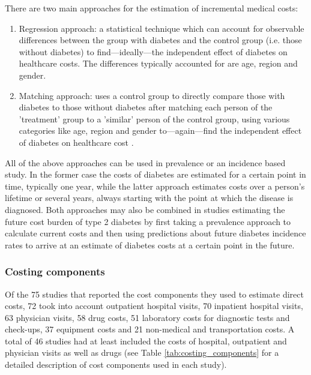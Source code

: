 {{\begin{footnotesize}
\begin{enumerate}
There are two main approaches for the estimation of incremental medical costs:
\begin{enumerate}

\item Regression approach: a statistical technique which can account for observable differences between the group with diabetes and the control group (i.e. those without diabetes) to find---ideally---the independent effect of diabetes on healthcare costs. The differences typically accounted for are age, region and gender.

\item Matching approach: uses a control group to directly compare those with diabetes to those without diabetes after matching each person of the 'treatment' group to a 'similar' person of the control group, using various categories like age, region and gender to---again---find the independent effect of diabetes on healthcare cost \parencite{Akobundu2006}.
\end{enumerate}
\end{enumerate}

All of the above approaches can be used in prevalence or an incidence based study. In the former case the costs of diabetes are estimated for a certain point in time, typically one year, while the latter approach estimates costs over a person's lifetime or several years, always starting with the point at which the disease is diagnosed. Both approaches may also be combined in studies estimating the future cost burden of type 2 diabetes by first taking a prevalence approach to calculate current costs and then using predictions about future diabetes incidence rates to arrive at an estimate of diabetes costs at a certain point in the future.\end{footnotesize}
}}

\subsubsection{Costing components}
Of the 75 studies that reported the cost components they used to estimate direct costs, 72 took into account outpatient hospital visits, 70 inpatient hospital visits, 63 physician visits, 58 drug costs, 51 laboratory costs for diagnostic tests and check-ups, 37 equipment costs and 21 non-medical and transportation costs. A total of 46 studies had at least included the costs of hospital, outpatient and physician visits as well as drugs (see Table \ref{tab:costing_components} for a detailed description of cost components used in each study).

